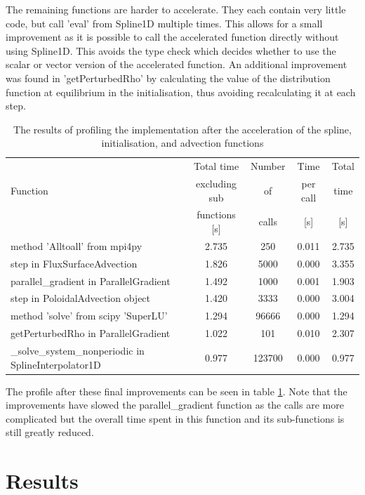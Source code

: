 The remaining functions are harder to accelerate. They each contain very little code, but call 'eval' from Spline1D multiple times. This allows for a small improvement as it is possible to call the accelerated function directly without using Spline1D. This avoids the type check which decides whether to use the scalar or vector version of the accelerated function. An additional improvement was found in 'getPerturbedRho' by calculating the value of the distribution function at equilibrium in the initialisation, thus avoiding recalculating it at each step.

\begin{table}[ht]
\centering
 \begin{tabular}{|m{}|c|c|c|c|}
  \hline
          & Total time & Number & Time & Total \\
  Function & excluding sub & of & per call & time \\
          & functions [s] & calls & [s] & [s] \\
  \hline
  \hline
  method 'Alltoall' from mpi4py & 2.735 & 250 & 0.011 & 2.735 \\
  \hline
  step in FluxSurfaceAdvection & 1.826 & 5000 & 0.000 & 3.355 \\
  \hline
  parallel\_gradient in ParallelGradient & 1.492 & 1000 & 0.001 & 1.903\\
  \hline
  step in PoloidalAdvection object & 1.420 & 3333 & 0.000 & 3.004\\
  \hline
  method 'solve' from scipy 'SuperLU' & 1.294 & 96666 & 0.000 & 1.294\\
  \hline
  getPerturbedRho in ParallelGradient & 1.022 & 101 & 0.010 & 2.307\\
  \hline
  \_solve\_system\_nonperiodic in SplineInterpolator1D & 0.977 & 123700 & 0.000 & 0.977\\
  \hline
 \end{tabular}
 \caption{\label{tab::final profile} The results of profiling the implementation after the acceleration of the spline, initialisation, and advection functions}
\end{table}

The profile after these final improvements can be seen in table \ref{tab::final profile}. Note that the improvements have slowed the parallel\_gradient function as the calls are more complicated but the overall time spent in this function and its sub-functions is still greatly reduced.

\section{Results}

